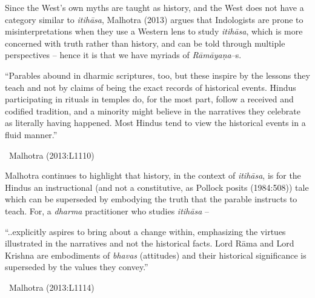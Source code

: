 Since the West’s own myths are taught as history, and the West does not have a category similar to \textit{itihāsa}, Malhotra (2013) argues that Indologists are prone to misinterpretations when they use a Western lens to study \textit{itihāsa}, which is more concerned with truth rather than history, and can be told through multiple perspectives – hence it is that we have myriads of \textit{Rāmāyaṇa}–s.

\begin{myquote}
“Parables abound in dharmic scriptures, too, but these inspire by the lessons they teach and not by claims of being the exact records of historical events. Hindus participating in rituals in temples do, for the most part, follow a received and codified tradition, and a minority might believe in the narratives they celebrate as literally having happened. Most Hindus tend to view the historical events in a fluid manner.”

~\hfill Malhotra (2013:L1110)
\end{myquote}

Malhotra continues to highlight that history, in the context of \textit{itihāsa}, is for the Hindus an instructional (and not a constitutive, as Pollock posits (1984:508)) tale which can be superseded by embodying the truth that the parable instructs to teach. For, a \textit{dharma} practitioner who studies \textit{itihāsa} –

\begin{myquote}
“..explicitly aspires to bring about a change within, emphasizing the virtues illustrated in the narratives and not the historical facts. Lord Rāma and Lord Krishna are embodiments of \textit{bhavas} (attitudes) and their historical significance is superseded by the values they convey.”

~\hfill Malhotra (2013:L1114)
\end{myquote}

